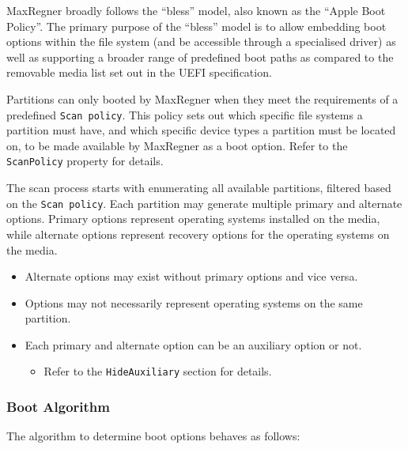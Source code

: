 \documentclass[]{article}
\providecommand{\tightlist}{%
  \setlength{\itemsep}{0pt}\setlength{\parskip}{0pt}}
\begin{document}
MaxRegner broadly follows the ``bless'' model, also known as the ``Apple Boot Policy''. The primary purpose of
the ``bless'' model is to allow embedding boot options within the file system (and be accessible through a
specialised driver) as well as supporting a broader range of predefined boot paths as compared to the
removable media list set out in the UEFI specification.

Partitions can only booted by MaxRegner when they meet the requirements of a predefined \texttt{Scan policy}.
This policy sets out which specific file systems a partition must have, and which specific device types
a partition must be located on, to be made available by MaxRegner as a boot option.
Refer to the \texttt{ScanPolicy} property for details.

The scan process starts with enumerating all available partitions, filtered based on the \texttt{Scan policy}.
Each partition may generate multiple primary and alternate options. Primary options represent operating systems
installed on the media, while alternate options represent recovery options for the operating systems on the media.
\begin{itemize}
\tightlist
\item Alternate options may exist without primary options and vice versa.
\item Options may not necessarily represent operating systems on the same partition.
\item Each primary and alternate option can be an auxiliary option or not.
\begin{itemize}
\tightlist
  \item Refer to the \texttt{HideAuxiliary} section for details.
\end{itemize} \medskip
\end{itemize}

\subsubsection{Boot Algorithm}\label{bootalgorithm}

The algorithm to determine boot options behaves as follows:
\end{document}

